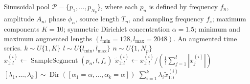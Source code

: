 \begin{algorithm}
\caption{Light TSMixup: Controlled Sinusoidal Time Series Mixup}
\label{alg:light_tsmixup}
\begin{algorithmic}[1]
\Require Sinusoidal pool $\mathcal{P}=\{p_1,\ldots,p_{N_p}\}$, where each $p_n$ is defined by frequency $f_n$, amplitude $A_n$, phase $\phi_n$, source length $T_n$, and sampling frequency $f_s$; maximum components $K=10$; symmetric Dirichlet concentration $\alpha=1.5$; minimum and maximum augmented lengths $(l_{\min}=128,l_{\max}=2048)$.
\Ensure An augmented time series.
\State $k \sim U\{1,K\}$ 
\State $l \sim U\{l_{\min},l_{\max}\}$ 
    \State $n \sim U\{1,N_p\}$ 
    \State $x^{(i)}_{1:l} \gets \operatorname{SampleSegment}(p_n,l,f_s)$ 
    \State $\tilde{x}^{(i)}_{1:l} \gets x^{(i)}_{1:l} \Big/ \left(\frac{1}{l}\sum_{j=1}^{l}\left|x^{(i)}_j\right|\right)$ 
\EndFor
\State $[\lambda_1,\ldots,\lambda_k] \sim \operatorname{Dir}([\alpha_1=\alpha,\ldots,\alpha_k=\alpha])$ 
\State \Return $\sum_{i=1}^{k}\lambda_i\tilde{x}^{(i)}_{1:l}$ 
\end{algorithmic}
\end{algorithm}